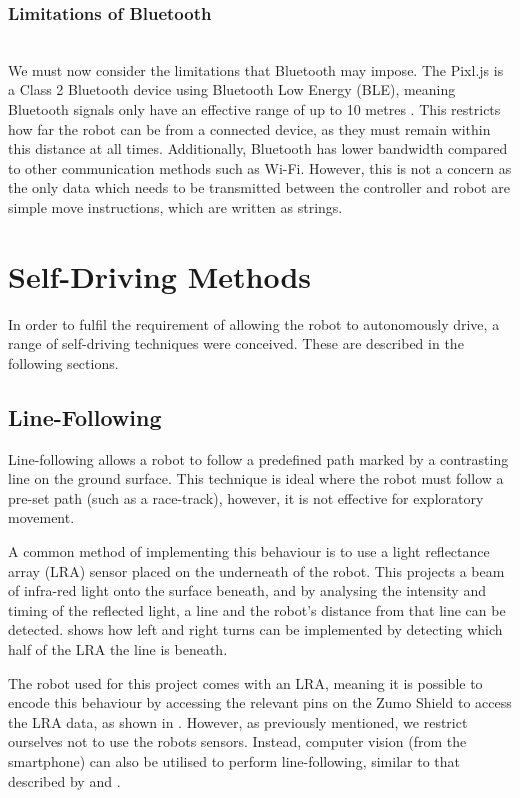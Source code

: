 \documentclass{l4proj}
\begin{document}
\subsubsection{Limitations of Bluetooth} \hfill \\
We must now consider the limitations that Bluetooth may impose. The Pixl.js is a Class 2 Bluetooth device using Bluetooth Low Energy (BLE), meaning Bluetooth signals only have an effective range of up to 10 metres \citep{bluetoothlimitations}. This restricts how far the robot can be from a connected device, as they must remain within this distance at all times. Additionally, Bluetooth has lower bandwidth compared to other communication methods such as Wi-Fi. However, this is not a concern as the only data which needs to be transmitted between the controller and robot are simple move instructions, which are written as strings. 


\section{Self-Driving Methods}\label{sec:self-driving-methods}
In order to fulfil the requirement of allowing the robot to autonomously drive, a range of self-driving techniques were conceived. These are described in the following sections.

\subsection{Line-Following}
Line-following allows a robot to follow a predefined path marked by a contrasting line on the ground surface. This technique is ideal where the robot must follow a pre-set path (such as a race-track), however, it is not effective for exploratory movement.

A common method of implementing this behaviour is to use a light reflectance array (LRA) sensor placed on the underneath of the robot. This projects a beam of infra-red light onto the surface beneath, and by analysing the intensity and timing of the reflected light, a line and the robot's distance from that line can be detected. \citet{zaman2016novel} shows how left and right turns can be implemented by detecting which half of the LRA the line is beneath.

The robot used for this project comes with an LRA, meaning it is possible to encode this behaviour by accessing the relevant pins on the Zumo Shield to access the LRA data, as shown in \citet{zumolinefollower}. However, as previously mentioned, we restrict ourselves not to use the robots sensors. Instead, computer vision (from the smartphone) can also be utilised to perform line-following, similar to that described by \citet{7347786} and \citet{ceron2018onboard}.
\end{document}
